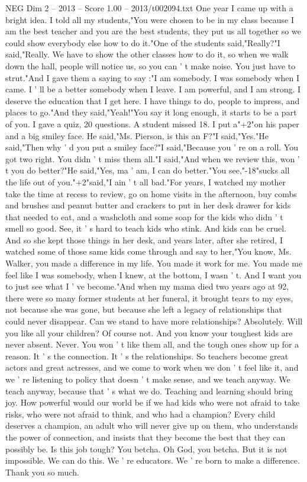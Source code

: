 \begin{textsample}{NEG Dim 2 – 2013 – Score 1.00 – 2013/t002094.txt}
One year I came up with a bright idea.
I told all my students,"You were chosen to be in my class because I am the best teacher and you are the best students, they put us all together so we could show everybody else how to do it."One of the students said,"Really?"I said,"Really.
We have to show the other classes how to do it, so when we walk down the hall, people will notice us, so you can ' t make noise.
You just have to strut."And I gave them a saying to say :"I am somebody.
I was somebody when I came.
I ' ll be a better somebody when I leave.
I am powerful, and I am strong.
I deserve the education that I get here.
I have things to do, people to impress, and places to go."And they said,"Yeah!"You say it long enough, it starts to be a part of you.
I gave a quiz, 20 questions.
A student missed 18.
I put a"+2"on his paper and a big smiley face.
He said,"Ms.
Pierson, is this an F?"I said,"Yes."He said,"Then why ' d you put a smiley face?"I said,"Because you ' re on a roll.
You got two right.
You didn ' t miss them all."I said,"And when we review this, won ' t you do better?"He said,"Yes, ma ' am, I can do better."You see,"-18"sucks all the life out of you."+2"said,"I ain ' t all bad."For years, I watched my mother take the time at recess to review, go on home visits in the afternoon, buy combs and brushes and peanut butter and crackers to put in her desk drawer for kids that needed to eat, and a washcloth and some soap for the kids who didn ' t smell so good.
See, it ' s hard to teach kids who stink.
And kids can be cruel.
And so she kept those things in her desk, and years later, after she retired, I watched some of those same kids come through and say to her,"You know, Ms.
Walker, you made a difference in my life.
You made it work for me.
You made me feel like I was somebody, when I knew, at the bottom, I wasn ' t.
And I want you to just see what I ' ve become."And when my mama died two years ago at 92, there were so many former students at her funeral, it brought tears to my eyes, not because she was gone, but because she left a legacy of relationships that could never disappear.
Can we stand to have more relationships?
Absolutely.
Will you like all your children?
Of course not.
And you know your toughest kids are never absent.
Never.
You won ' t like them all, and the tough ones show up for a reason.
It ' s the connection.
It ' s the relationships.
So teachers become great actors and great actresses, and we come to work when we don ' t feel like it, and we ' re listening to policy that doesn ' t make sense, and we teach anyway.
We teach anyway, because that ' s what we do.
Teaching and learning should bring joy.
How powerful would our world be if we had kids who were not afraid to take risks, who were not afraid to think, and who had a champion?
Every child deserves a champion, an adult who will never give up on them, who understands the power of connection, and insists that they become the best that they can possibly be.
Is this job tough?
You betcha.
Oh God, you betcha.
But it is not impossible.
We can do this.
We ' re educators.
We ' re born to make a difference.
Thank you so much.

\end{textsample}
